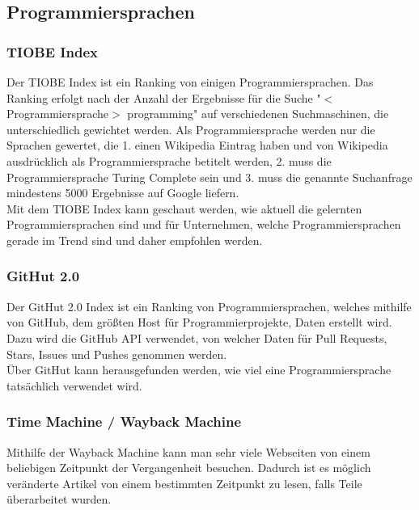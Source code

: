 \documentclass[ngerman]{article}
\begin{document}
    \subsection{Programmiersprachen}
    \subsubsection{TIOBE Index}
    \label{GrundlagenTIOBE}
    Der TIOBE Index ist ein Ranking von einigen Programmiersprachen. Das Ranking erfolgt nach der Anzahl der Ergebnisse für die Suche "$<$Programmiersprache$>$ programming" auf verschiedenen Suchmaschinen, die unterschiedlich gewichtet werden. Als Programmiersprache werden nur die Sprachen gewertet, die 1. einen Wikipedia Eintrag haben und von Wikipedia ausdrücklich als Programmiersprache betitelt werden, 2. muss die Programmiersprache Turing Complete sein und 3. muss die genannte Suchanfrage mindestens 5000 Ergebnisse auf Google liefern.\\
    Mit dem TIOBE Index kann geschaut werden, wie aktuell die gelernten Programmiersprachen sind und für Unternehmen, welche Programmiersprachen gerade im Trend sind und daher empfohlen werden. \cite{TIOBE Index}
    \subsubsection{GitHut 2.0}
    \label{GrundlagenGitHut}
    Der GitHut 2.0 Index ist ein Ranking von Programmiersprachen, welches mithilfe von GitHub, dem größten Host für Programmierprojekte, Daten erstellt wird. Dazu wird die GitHub API verwendet, von welcher Daten für Pull Requests, Stars, Issues und Pushes genommen werden.\\
    Über GitHut kann herausgefunden werden, wie viel eine Programmiersprache tatsächlich verwendet wird.\cite{GitHut 2.0}
    \subsubsection{Time Machine / Wayback Machine}
    \label{GrundlagenTimeMachine}
    Mithilfe der Wayback Machine kann man sehr viele Webseiten von einem beliebigen Zeitpunkt der Vergangenheit besuchen. Dadurch ist es möglich veränderte Artikel von einem bestimmten Zeitpunkt zu lesen, falls Teile überarbeitet wurden.
\end{document}
